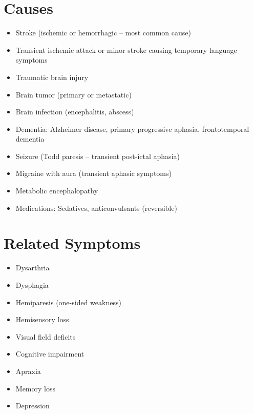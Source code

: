 \section*{Causes}
\begin{itemize}
 \item Stroke (ischemic or hemorrhagic -- most common cause)
 \item Transient ischemic attack or minor stroke causing temporary language symptoms
 \item Traumatic brain injury
 \item Brain tumor (primary or metastatic)
 \item Brain infection (encephalitis, abscess)
 \item Dementia: Alzheimer disease, primary progressive aphasia, frontotemporal dementia
 \item Seizure (Todd paresis -- transient post-ictal aphasia)
 \item Migraine with aura (transient aphasic symptoms)
 \item Metabolic encephalopathy
 \item Medications: Sedatives, anticonvulsants (reversible)
\end{itemize}

\section*{Related Symptoms}
\begin{itemize}
 \item Dysarthria
 \item Dysphagia
 \item Hemiparesis (one-sided weakness)
 \item Hemisensory loss
 \item Visual field deficits
 \item Cognitive impairment
 \item Apraxia
 \item Memory loss
 \item Depression
\end{itemize}

